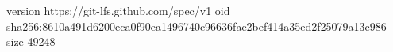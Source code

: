 version https://git-lfs.github.com/spec/v1
oid sha256:8610a491d6200eca0f90ea1496740c96636fae2bef414a35ed2f25079a13c986
size 49248
